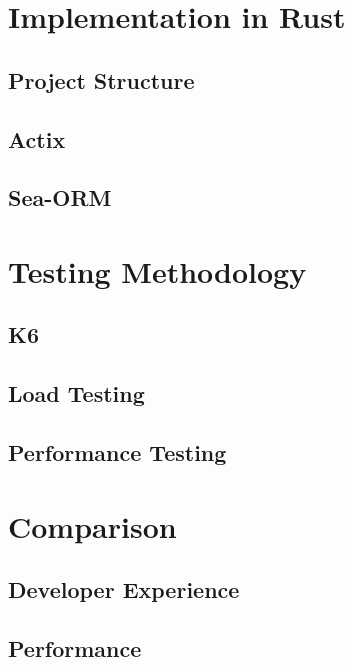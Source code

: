 \documentclass[a4paper,12pt]{article}
\begin{document}
	\section{Implementation in Rust}
	\label{sec:rust_implementation}
	\subsection{Project Structure}
	\label{subsec:project_structure_rust}

	\subsection{Actix}
	\label{subsec:actix}
	
	\subsection{Sea-ORM}
	\label{subsec:sea_orm}

	\section{Testing Methodology}
	\label{sec:testing_methodology}

	\subsection{K6}
	\label{subsec:k6}

	\subsection{Load Testing}
	\label{subsec:load_testing}

	\subsection{Performance Testing}
	\label{subsec:performance_testing}

	\section{Comparison}
	\label{sec:comparison}
	\subsection{Developer Experience}
	\subsection{Performance}
	
\end{document}
